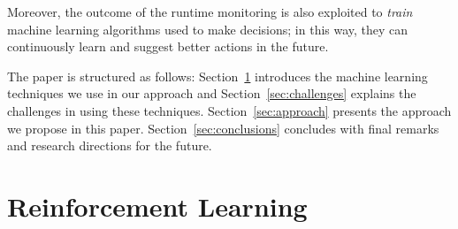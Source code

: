 \documentclass[sigconf,review, anonymous]{acmart}
\begin{document}

Moreover, the outcome of the runtime monitoring is also exploited to \emph{train} machine learning algorithms used to make decisions; in this way, they can continuously learn and suggest better actions in the future.

The paper is structured as follows: Section~\ref{sec:reinforcementLearning} introduces the machine learning techniques we use in our approach and Section~\ref{sec:challenges} explains the challenges in using these techniques.  Section~\ref{sec:approach} presents the approach we propose in this paper.
Section~\ref{sec:conclusions} concludes with final remarks and research directions for the future. 

\section{Reinforcement Learning}\label{sec:reinforcementLearning}

%

\end{document}
